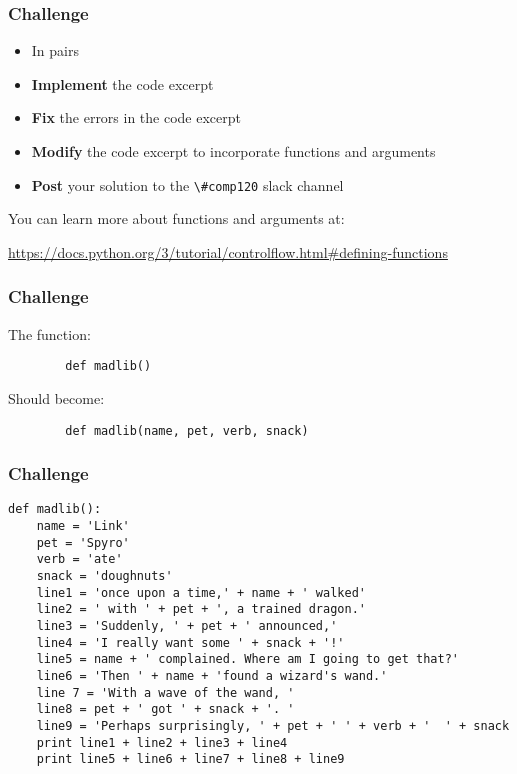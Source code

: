 \begin{frame}
	\frametitle{Challenge}
	
	\begin{itemize}
		\item In pairs
		\item \textbf{Implement} the code excerpt
		\item \textbf{Fix} the errors in the code excerpt
		\item \textbf{Modify} the code excerpt to incorporate functions and arguments
		\item \textbf{Post} your solution to the \lstinline{\#comp120} slack channel
	\end{itemize}
	
	You can learn more about functions and arguments at:
	
	\vspace{1em}
	
	 \url{https://docs.python.org/3/tutorial/controlflow.html\#defining-functions}
	
	\vspace{1em}
	
\end{frame}

\begin{frame}[fragile]
	\frametitle{Challenge}
		
	The function:

	\begin{lstlisting}
		def madlib()
	\end{lstlisting}
	
	\vspace{1.5em}
	
	Should become:
	
	\begin{lstlisting}
		def madlib(name, pet, verb, snack)
	\end{lstlisting}
	
\end{frame}

\begin{frame}[fragile]
	\frametitle{Challenge}
	
	\begin{lstlisting}
def madlib():
	name = 'Link'
	pet = 'Spyro'
	verb = 'ate'
	snack = 'doughnuts'
	line1 = 'once upon a time,' + name + ' walked'
	line2 = ' with ' + pet + ', a trained dragon.'
	line3 = 'Suddenly, ' + pet + ' announced,'
	line4 = 'I really want some ' + snack + '!'
	line5 = name + ' complained. Where am I going to get that?'
	line6 = 'Then ' + name + 'found a wizard's wand.'
	line 7 = 'With a wave of the wand, '
	line8 = pet + ' got ' + snack + '. '
	line9 = 'Perhaps surprisingly, ' + pet + ' ' + verb + '  ' + snack
	print line1 + line2 + line3 + line4
	print line5 + line6 + line7 + line8 + line9
\end{lstlisting}
	
\end{frame}